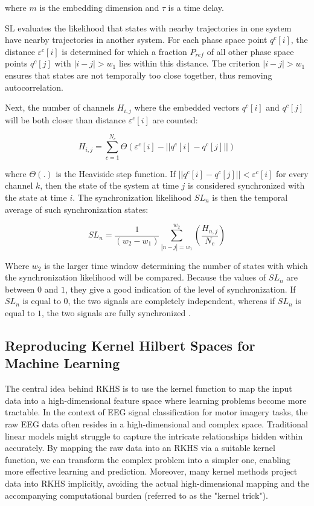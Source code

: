 where $m$ is the embedding dimension and $\tau$ is a time delay.

SL evaluates the likelihood that states with nearby trajectories in one system have nearby trajectories in another system. For each phase space point $q^{c}[i]$, the distance $\varepsilon^{c}[i]$ is determined for which a fraction $P_{ref}$ of all other phase space points $q^{c}[j]$  with $|i-j| > w_{1}$ lies within this distance. The criterion $|i-j| > w_{1}$ ensures that states are not temporally too close together, thus removing autocorrelation. 

Next, the number of channels $H_{i, j}$ where the embedded vectors $q^{c}[i]$ and $q^{c}[j]$ will be both closer than distance $\varepsilon^{c}[i]$ are counted:

\begin{equation}
H_{i, j} = \sum_{c=1}^{N_c} \Theta(\varepsilon^{c}[i]- ||q^{c}[i]-q^{c}[j]||)
\end{equation}

where $\Theta(.)$ is the Heaviside step function. If $||q^{c}[i] - q^{c}[j]|| < \varepsilon^{c}[i]$ for every channel $k$, then the state of the system at time $j$ is considered synchronized with the state at time $i$. The synchronization likelihood $SL_n$ is then the temporal average of such synchronization states:

\begin{equation}
SL_{n}= \frac{1}{(w_{2}-w_{1})} \sum_{|n-j| = w_1}^{w_2} \left(\frac{H_{n, j}}{N_c}\right)
\end{equation}

Where $w_2$ is the larger time window determining the number of states with which the synchronization likelihood will be compared. Because the values of $SL_n$ are between $0$ and $1$, they give a good indication of the level of synchronization. If $SL_n$ is equal to $0$, the two signals are completely independent, whereas if $SL_n$ is equal to $1$, the two signals are fully synchronized \cite{gonzalez2021network}.


\subsection{Reproducing Kernel Hilbert Spaces for Machine Learning}

The central idea behind RKHS is to use the kernel function to map the input data into a high-dimensional feature space where learning problems become more tractable. In the context of EEG signal classification for motor imagery tasks, the raw EEG data often resides in a high-dimensional and complex space. Traditional linear models might struggle to capture the intricate relationships hidden within accurately. By mapping the raw data into an RKHS via a suitable kernel function, we can transform the complex problem into a simpler one, enabling more effective learning and prediction. Moreover, many kernel methods project data into RKHS implicitly, avoiding the actual high-dimensional mapping and the accompanying computational burden (referred to as the "kernel trick").

